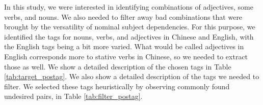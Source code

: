 \documentclass[smallextended,natbib]{svjour3}       %
\begin{document}
    In this study, we were interested in identifying combinations of adjectives, some verbs, and nouns. We also needed to filter away bad combinations that were brought by the versatility of nominal subject dependencies. For this purpose, we identified the tags for nouns, verbs, and adjectives in Chinese and English, with the English tags being a bit more varied. What would be called adjectives in English corresponds more to stative verbs in Chinese, so we needed to extract those as well. We show a detailed description of the chosen tags in Table \ref{tab:target_postag}. We also show a detailed description of the tags we needed to filter. We selected these tags heuristically by observing commonly found undesired pairs, in Table \ref{tab:filter_postag}.

\end{document}
